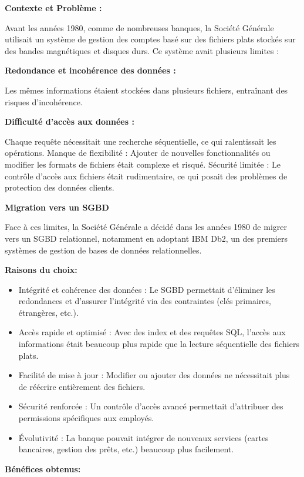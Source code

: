 \documentclass{article}
\begin{document}
\textbf{Contexte et Problème :}

Avant les années 1980, comme de nombreuses banques, la Société Générale utilisait un système de gestion des comptes basé sur des fichiers plats stockés sur des bandes magnétiques et disques durs. Ce système avait plusieurs limites :

    \textbf{Redondance et incohérence des données :}

    Les mêmes informations étaient stockées dans plusieurs fichiers, entraînant des risques d’incohérence.

    \textbf{Difficulté d’accès aux données :}

    Chaque requête nécessitait une recherche séquentielle, ce qui ralentissait les opérations.
    Manque de flexibilité : Ajouter de nouvelles fonctionnalités ou modifier les formats de fichiers était complexe et risqué.
    Sécurité limitée : Le contrôle d’accès aux fichiers était rudimentaire, ce qui posait des problèmes de protection des données clients.

\textbf{Migration vers un SGBD}

Face à ces limites, la Société Générale a décidé dans les années 1980 de migrer vers un SGBD relationnel, notamment en adoptant IBM Db2, un des premiers systèmes de gestion de bases de données relationnelles.

\textbf{Raisons du choix:}

    \begin{itemize}
      \item Intégrité et cohérence des données : Le SGBD permettait d’éliminer les redondances et d’assurer l’intégrité via des contraintes (clés primaires, étrangères, etc.).
      \item Accès rapide et optimisé : Avec des index et des requêtes SQL, l’accès aux informations était beaucoup plus rapide que la lecture séquentielle des fichiers plats.
      \item Facilité de mise à jour : Modifier ou ajouter des données ne nécessitait plus de réécrire entièrement des fichiers.
      \item Sécurité renforcée : Un contrôle d’accès avancé permettait d’attribuer des permissions spécifiques aux employés.
      \item Évolutivité : La banque pouvait intégrer de nouveaux services (cartes bancaires, gestion des prêts, etc.) beaucoup plus facilement.
    \end{itemize}

\textbf{Bénéfices obtenus:}
\end{document}

